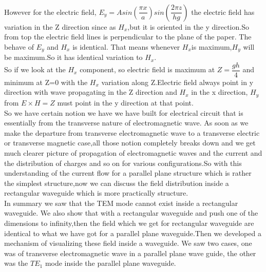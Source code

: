  \paragraph{}However for the electric field, ${E_y= Asin(\dfrac{\pi x}{a})sin(\dfrac{2\pi z}{hg})}$ the electric field has variation in the Z direction since as ${H_x}$,but it is oriented in the y direction.So from top the electric field lines is perpendicular to the plane of the paper. The behave of ${E_y}$ and ${H_x}$ is identical. That means whenever ${H_x}$is maximum,${H_y}$ will be maximum.So it has identical variation to ${H_x}$.\\
  So if we look at the ${H_x}$ component, so electric field is maximum at ${Z= \dfrac{gh}{4}}$ and minimum at Z=0 with the ${H_x}$ variation along Z.Electric field always point in y direction with wave propagating in the Z direction and ${H_x}$ in the x direction, ${H_y}$ from ${E\times H= Z}$ must point in the y direction at that point.\\
   So we have certain notion we have we have built for electrical circuit that is essentially from the transverse nature of electromagnetic wave. As soon as we make the departure from transverse electromagnetic wave to a transverse electric or transverse magnetic case,all those notion completely breaks down and we get much clearer picture of propagation of electromagnetic waves and the current and the distribution of charges and so on for various configurations.So with this understanding of the current flow for a parallel plane structure which is rather the simplest structure,now we can discuss the field distribution inside a rectangular waveguide which is more practically structure.\\
    In summary we saw that the TEM mode cannot exist inside a rectangular waveguide. We also show that with a rectangular waveguide and push one of the dimensions to infinity,then the field which we get for rectangular waveguide are identical to what we have got for a parallel plane waveguide.Then we developed a mechanism of visualizing these field inside a waveguide. We saw two cases, one was of transverse electromagnetic wave in a parallel plane wave guide, the other was the ${TE_1}$ mode inside the parallel plane waveguide. 
	